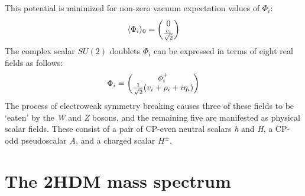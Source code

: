 This potential is minimized for non-zero vacuum expectation values of $\Phi_i$:
\begin{align}
\langle\Phi_i\rangle_0=\begin{pmatrix} 0 \\ \frac{v_i}{\sqrt{2}}\end{pmatrix}
\end{align}
The complex scalar $SU(2)$ doublets $\Phi_i$ can be expressed in terms of eight real fields as follows:
\begin{equation}\label{eq:2HDM_doublet_components}
\Phi_i = \begin{pmatrix} \phi_i^+ \\ \frac{1}{\sqrt{2}}(v_i+\rho_i+i\eta_i)\end{pmatrix}
\end{equation}
The process of electroweak symmetry breaking causes three of these fields to be `eaten' by the \emph{W} and \emph{Z} bosons, and the remaining five are manifested as physical scalar fields. These consist of a pair of CP-even neutral scalars \emph{h} and \emph{H}, a CP-odd pseudoscalar \emph{A}, and a charged scalar $H^\pm$.

\section{The 2HDM mass spectrum}

